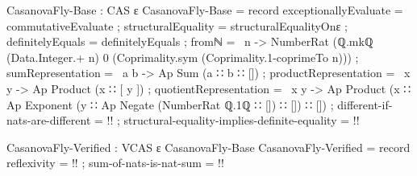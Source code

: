 \documentclass{report}
\begin{document}
\begin{code}
CasanovaFly-Base : CAS ε
CasanovaFly-Base = record
  { exceptionallyEvaluate = commutativeEvaluate
  ; structuralEquality = structuralEqualityOnε
  ; definitelyEquals = definitelyEquals
  ; fromℕ = \ n ->
      NumberRat (ℚ.mkℚ (Data.Integer.+ n)
                       0
                       (Coprimality.sym (Coprimality.1-coprimeTo n)))
  ; sumRepresentation = \ a b -> Ap Sum (a ∷ b ∷ [])
  ; productRepresentation = \ x y -> Ap Product (x ∷ [ y ])
  ; quotientRepresentation = \ x y ->
     Ap Product (x ∷ Ap Exponent (y ∷ Ap Negate (NumberRat ℚ.1ℚ ∷ []) ∷ []) ∷ [])
  ; different-if-nats-are-different = {!!}
  ; structural-equality-implies-definite-equality = {!!}
  }

CasanovaFly-Verified : VCAS ε CasanovaFly-Base
CasanovaFly-Verified = record
  {reflexivity = {!!}
  ; sum-of-nats-is-nat-sum = {!!}
  }
\end{code}
\end{document}
